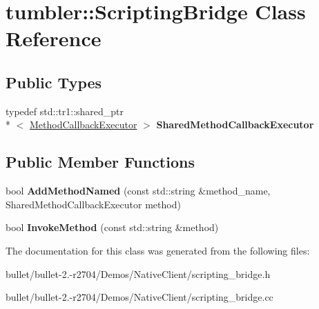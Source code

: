\hypertarget{classtumbler_1_1_scripting_bridge}{\section{tumbler\+:\+:Scripting\+Bridge Class Reference}
\label{classtumbler_1_1_scripting_bridge}
}
\subsection*{Public Types}
\begin{DoxyCompactItemize}
\item 
\hypertarget{classtumbler_1_1_scripting_bridge_aa87d8f63e8cc3979d41d3b4ad843ad54}{typedef std\+::tr1\+::shared\+\_\+ptr\\*
$<$ \hyperlink{classtumbler_1_1_method_callback_executor}{Method\+Callback\+Executor} $>$ {\bfseries Shared\+Method\+Callback\+Executor}}\label{classtumbler_1_1_scripting_bridge_aa87d8f63e8cc3979d41d3b4ad843ad54}

\end{DoxyCompactItemize}
\subsection*{Public Member Functions}
\begin{DoxyCompactItemize}
\item 
\hypertarget{classtumbler_1_1_scripting_bridge_a81bed92917dedc76627a39566607fd7a}{bool {\bfseries Add\+Method\+Named} (const std\+::string \&method\+\_\+name, Shared\+Method\+Callback\+Executor method)}\label{classtumbler_1_1_scripting_bridge_a81bed92917dedc76627a39566607fd7a}

\item 
\hypertarget{classtumbler_1_1_scripting_bridge_aca32e0cc658f9e1ad4ff1a3e90f0206d}{bool {\bfseries Invoke\+Method} (const std\+::string \&method)}\label{classtumbler_1_1_scripting_bridge_aca32e0cc658f9e1ad4ff1a3e90f0206d}

\end{DoxyCompactItemize}


The documentation for this class was generated from the following files\+:\begin{DoxyCompactItemize}
\item 
bullet/bullet-\/2.-\/r2704/\+Demos/\+Native\+Client/scripting\+\_\+bridge.\+h\item 
bullet/bullet-\/2.-\/r2704/\+Demos/\+Native\+Client/scripting\+\_\+bridge.\+cc\end{DoxyCompactItemize}
